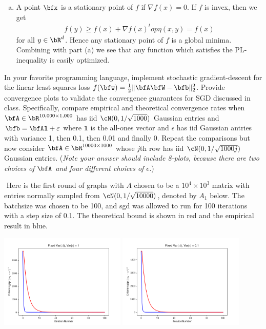 \begin{homework}[e]
\begin{prf}
\begin{enumerate}[(a)]
      \item A point $\bfx$ is a stationary point of $f$ if $\nabla f(x) = 0$. If $f$ is invex, then we get
        \begin{align*}
          f(y) \geq f(x) + \nabla f(x)^top \eta(x,y) = f(x)
        \end{align*}
        for all $y\in \bR^d$. Hence any stationary point of $f$ is a global minima. Combining with part (a) we see that any function which satisfies the PL-inequality is easily optimized.
    \end{enumerate}
  \end{prf}
  \prob In your favorite programming language, implement stochastic gradient-descent for the linear least squares loss $f(\bfw) = \frac{1}{2}\|\bfA\bfW - \bfb\|^2_2$. Provide convergence plots to validate the convergence guarantees for SGD discussed in class. Specifically, compare empirical and theoretical convergence rates when $\bfA \in \bR^{10,000\times 1,000}$ has iid $\cN(0, 1/\sqrt{1000})$ Gaussian entries and $\bfb = \bfA\mathbf{1} + \epsilon$ where $\mathbf{1}$ is the all-ones vector and $\epsilon$ has iid Gaussian antries with variance 1, then 0.1, then 0.01 and finally 0. Repeat the comparisons but now consider $\bfA \in \bR^{10000 \times 1000}$ whose $j$th row has iid $\cN(0,1/\sqrt{1000j})$ Gaussian entries. (\emph{Note your answer should include 8-plots, because there are two choices of $\bfA$ and four different choices of $\epsilon$.})
  \begin{prf} $ $
    Here is the first round of graphs with $A$ chosen to be a $10^4 \times 10^3$ matrix with entries normally sampled from $\cN(0,1/\sqrt{10000})$, denoted by $A_1$ below. The batchsize was chosen to be 100, and sgd was allowed to run for 100 iterations with a step size of 0.1. The theoretical bound is shown in red and the empirical result in blue.
    \begin{center}
      \centering
      \includegraphics[width=0.45\textwidth]{figures/graph1.png}
      \includegraphics[width=0.45\textwidth]{figures/graph2.png}


\end{center}
\end{prf}
\end{homework}
